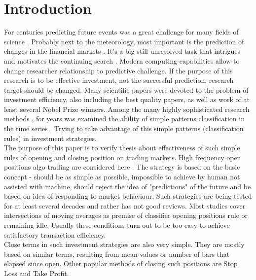 \documentclass{tewiart}
\begin{document}
\section{Introduction}
\indent For centuries predicting future events was a great challenge for many fields of science \cite{ball07, wu12}. Probably next to the meteorology, most important is the prediction of changes in the financial markets \cite{krutsinger99, satchwell05, schwager02}. It's a big still unresolved task that intrigues and motivates the continuing search \cite{fama91, fama98}. Modern computing capabilities allow to change researcher relationship to predictive challenge. If the purpose of this research is to be effective investment, not the successful prediction, research target should be changed. Many scientific papers were devoted to the problem of investment efficiency, also including the best quality papers, as well as work of at least several Nobel Prize winners. Among the many highly sophisticated research methods \cite{fujimoto03, kompa08, pawlak02, pedrycz97, rua09, raghuraj09, wilinski09} , for years was examined the ability of simple patterns classification in the time series \cite{brock92, cai05, gencay99, lebaron99, satchwell05}. Trying to take advantage of this simple patterns (classification rules) in investment strategies.\\
\indent The purpose of this paper is to verify thesis about effectiveness of such simple rules of opening and closing position on trading markets. High frequency open positions algo trading are considered here \cite{muriel04}. The strategy is based on the basic concept - should be as simple as possible, impossible to achieve by human not assisted with machine, should reject the idea of "predictions" of the future and be based on idea of responding to market behaviour. Such strategies are being tested for at least several decades and rather has not good reviews. Most studies cover intersections of moving averages as premise of classifier opening positions rule or remaining idle. Usually these conditions turn out to be too easy to achieve satisfactory transaction efficiency.\\
\indent Close terms in such investment strategies are also very simple. They are mostly based on similar terms, resulting from mean values or number of bars that elapsed since open. Other popular methods of closing such positions are Stop Loss and Take Profit.
\end{document}
